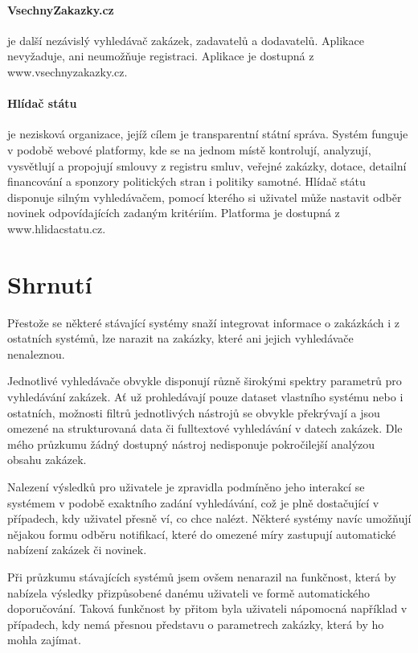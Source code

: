 \documentclass[thesis=M,czech]{FITthesis}[2019/12/23]
\begin{document}
\paragraph{VsechnyZakazky.cz}
je další nezávislý vyhledávač zakázek, zadavatelů a dodavatelů. Aplikace nevyžaduje, ani neumožňuje registraci. Aplikace je dostupná z www.vsechnyzakazky.cz.

\paragraph{Hlídač státu}
 je nezisková organizace, jejíž cílem je transparentní státní správa. Systém funguje v podobě webové platformy, kde se na jednom místě kontrolují, analyzují, vysvětlují a propojují smlouvy z registru smluv, veřejné zakázky, dotace, detailní financování a sponzory politických stran i politiky samotné\cite{hlidacstatu}. Hlídač státu disponuje silným vyhledávačem, pomocí kterého si uživatel může nastavit odběr novinek odpovídajících zadaným kritériím. Platforma je dostupná z www.hlidacstatu.cz.

\section{Shrnutí}
\label{sec:current_systems_summary}
Přestože se některé stávající systémy snaží integrovat informace o zakázkách i z ostatních systémů, lze narazit na zakázky, které ani jejich vyhledávače nenaleznou.

Jednotlivé vyhledávače obvykle disponují různě širokými spektry parametrů pro vyhledávání zakázek. Ať už prohledávají pouze dataset vlastního systému nebo i ostatních, možnosti filtrů jednotlivých nástrojů se obvykle překrývají a jsou omezené na strukturovaná data či fulltextové vyhledávání v datech zakázek. Dle mého průzkumu žádný dostupný nástroj nedisponuje pokročilejší analýzou obsahu zakázek.

Nalezení výsledků pro uživatele je zpravidla podmíněno jeho interakcí se systémem v podobě exaktního zadání vyhledávání, což je plně dostačující v případech, kdy uživatel přesně ví, co chce nalézt. Některé systémy navíc umožňují nějakou formu odběru notifikací, které do omezené míry zastupují automatické nabízení zakázek či novinek.

Při průzkumu stávajících systémů jsem ovšem nenarazil na funkčnost, která by nabízela výsledky přizpůsobené danému uživateli ve formě automatického doporučování. Taková funkčnost by přitom byla uživateli nápomocná například v případech, kdy nemá přesnou představu o parametrech zakázky, která by ho mohla zajímat.
\end{document}
